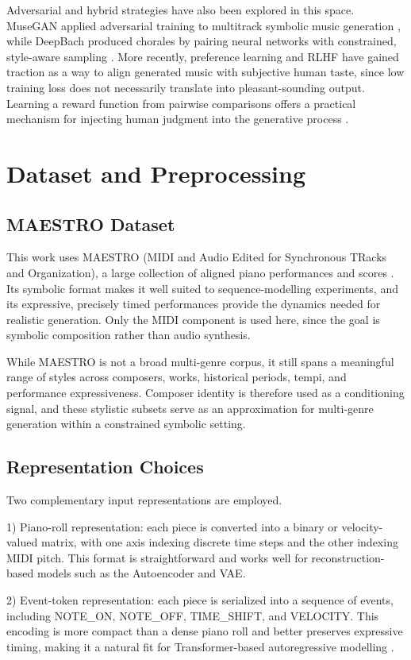 \documentclass[conference]{IEEEtran}
\begin{document}
Adversarial and hybrid strategies have also been explored in this space. MuseGAN applied adversarial training to multitrack symbolic music generation \cite{musegan}, while DeepBach produced chorales by pairing neural networks with constrained, style-aware sampling \cite{deepbach}. More recently, preference learning and RLHF have gained traction as a way to align generated music with subjective human taste, since low training loss does not necessarily translate into pleasant-sounding output. Learning a reward function from pairwise comparisons offers a practical mechanism for injecting human judgment into the generative process \cite{rlhf, instructgpt}.

\section{Dataset and Preprocessing}
\subsection{MAESTRO Dataset}
This work uses MAESTRO (MIDI and Audio Edited for Synchronous TRacks and Organization), a large collection of aligned piano performances and scores \cite{maestro}. Its symbolic format makes it well suited to sequence-modelling experiments, and its expressive, precisely timed performances provide the dynamics needed for realistic generation. Only the MIDI component is used here, since the goal is symbolic composition rather than audio synthesis.

While MAESTRO is not a broad multi-genre corpus, it still spans a meaningful range of styles across composers, works, historical periods, tempi, and performance expressiveness. Composer identity is therefore used as a conditioning signal, and these stylistic subsets serve as an approximation for multi-genre generation within a constrained symbolic setting.

\subsection{Representation Choices}
Two complementary input representations are employed.

1) Piano-roll representation: each piece is converted into a binary or velocity-valued matrix, with one axis indexing discrete time steps and the other indexing MIDI pitch. This format is straightforward and works well for reconstruction-based models such as the Autoencoder and VAE.

2) Event-token representation: each piece is serialized into a sequence of events, including NOTE\_ON, NOTE\_OFF, TIME\_SHIFT, and VELOCITY. This encoding is more compact than a dense piano roll and better preserves expressive timing, making it a natural fit for Transformer-based autoregressive modelling \cite{timewithfeeling}.
\end{document}
